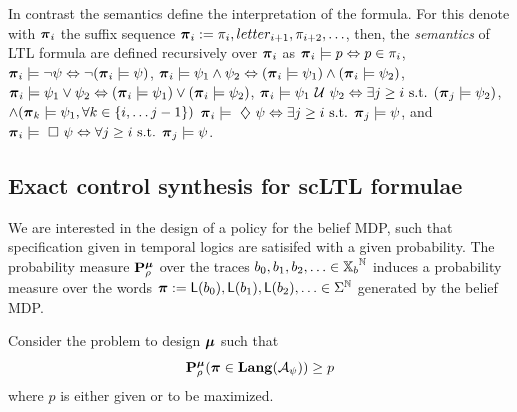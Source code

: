 \documentclass{ifacconf}
\newcommand{\red}[1]{{\color{red} #1}}
\renewcommand{\axx}[1]{{\color{orange} Ali: #1}}
\newcommand{\new}[1]{{\color{blue}#1}}
\begin{document}
In contrast the semantics define the interpretation of the formula. For this denote with  ${\boldsymbol{\pi}}_i$ the suffix sequence  ${\boldsymbol{\pi}}_i:= \pi_i, letter_{i+1}, \pi_{i+2}, \ldots$, 
     then, the {\em semantics} of LTL  formula are defined recursively  over ${\boldsymbol{\pi}}_i$ as
${\boldsymbol{\pi}}_i \models p   \Leftrightarrow p\in\pi_i$, 
    ${\boldsymbol{\pi}}_i \models \neg \psi  \Leftrightarrow\neg ({\boldsymbol{\pi}}_i \models \psi) $, 
    ${\boldsymbol{\pi}}_i \models \psi_1 \wedge  \psi_2   \Leftrightarrow  ( {\boldsymbol{\pi}}_i \models \psi_1 ) \wedge ( {\boldsymbol{\pi}}_i \models \psi_2 ) $, 
    ${\boldsymbol{\pi}}_i \models \psi_1 \vee  \psi_2   \Leftrightarrow  ( {\boldsymbol{\pi}}_i \models \psi_1 ) \vee ( {\boldsymbol{\pi}}_i \models \psi_2 ) $, 
    ${\boldsymbol{\pi}}_i \models  \psi_1 \ \mathcal{U}\  \psi_2  \Leftrightarrow \exists j \geq i \text{ s.t. } ({\boldsymbol{\pi}}_j \models \psi_2 ) $, 
    $  \wedge ({\boldsymbol{\pi}}_k \models \psi_1, \forall k \in \{i, \ldots j-1\})$
    ${\boldsymbol{\pi}}_i \models \ \diamondsuit\  \psi   \Leftrightarrow \exists j \geq i \text{ s.t. }{\boldsymbol{\pi}}_j \models \psi $, and 
    ${\boldsymbol{\pi}}_i \models \ \square\  \psi   \Leftrightarrow  \forall j \geq i \text{ s.t. }{\boldsymbol{\pi}}_j \models \psi$.


 




\subsection{Exact control synthesis for scLTL formulae}
We are interested in the design of a policy for the belief MDP, such that specification given in temporal logics are satisifed with a given probability. 
\new{
The probability measure $\mathbf{P}_\rho^{\boldsymbol{\mu}}$ over the traces $b_0, b_1, b_2, \ldots\in {{\mathbb{X}}_b}^{\mathbb N}$ induces a probability measure over the words ${\boldsymbol{\pi}}:= \mathsf{L}(b_0), \mathsf{L}(b_1), \mathsf{L}(b_2), \ldots\in \Sigma^{\mathbb N}$ generated by the belief MDP.}

Consider the problem to design ${\boldsymbol{\mu}}$ such that  
\[\mathbf{P}_\rho^{\boldsymbol{\mu}}
({\boldsymbol{\pi}} \in\mathbf{Lang} (\mathcal A_\psi))\geq p\]
where $p$ is either given or to be maximized.
\end{document}
